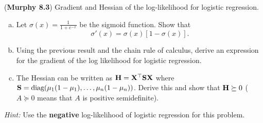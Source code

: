 \documentclass[12pt,letterpaper]{hmcpset}
\begin{document}
\begin{problem}[1]
	(\textbf{Murphy 8.3}) Gradient and Hessian of the log-likelihood for
	logistic regression.
	\begin{enumerate}[(a)]
		\item Let $\sigma(x) = \frac{1}{1 + e^{-x}}$ be the sigmoid function. Show that
		$$
		\sigma'(x) = \sigma(x)\left[1 - \sigma(x)\right].
		$$
		\item Using the previous result and the chain rule of calculus, derive an
		expression for the gradient of the log likelihood for logistic regression.
		\item The Hessian can be written as ${\bf H}={\bf X}^\top{\bf S}{\bf X}$ where ${\bf S} =
		{\hbox{diag}}(\mu_1(1-\mu_1), \dots, \mu_n(1-\mu_n))$. Derive this and show that
		${\bf H} \succeq 0$ ($A \succeq 0$ means that $A$ is positive semidefinite).\\
	\end{enumerate} 

\textit{Hint:} Use the \textbf{negative} log-likelihood of logistic regression for this problem.
\end{problem}
\end{document}
